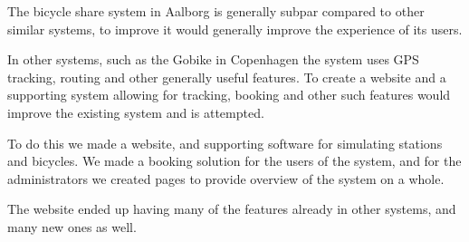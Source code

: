 The bicycle share system in Aalborg is generally subpar compared to other similar systems, to improve it would generally improve the experience of its users.

In other systems, such as the Gobike in Copenhagen the system uses GPS tracking, routing and other generally useful features. 
To create a website and a supporting system allowing for tracking, booking and other such features would improve the existing system and is attempted.

To do this we made a website, and supporting software for simulating stations and bicycles. We made a booking solution for the users of the system, and for the administrators we created pages to provide overview of the system on a whole.

The website ended up having many of the features already in other systems, and many new ones as well.